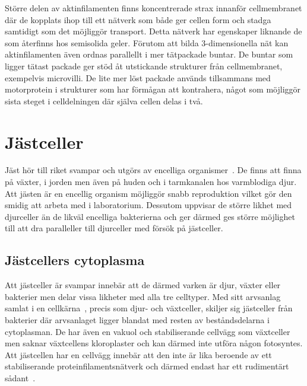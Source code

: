 Större delen av aktinfilamenten finns koncentrerade strax innanför cellmembranet där de kopplats ihop till ett nätverk som både ger cellen form och stadga samtidigt som det möjliggör transport. Detta nätverk har egenskaper liknande de som återfinns hos semisolida geler. Förutom att bilda 3-dimensionella nät kan aktinfilamenten även ordnas parallellt i mer tätpackade buntar. De buntar som ligger tätast packade ger stöd åt utstickande strukturer från cellmembranet, exempelvis microvilli. De lite mer löst packade används tillsammans med motorprotein i strukturer som har förmågan att kontrahera, något som möjliggör sista steget i celldelningen där själva cellen delas i två. 



\section{Jästceller}

Jäst hör till riket svampar och utgörs av encelliga organismer~\cite{SGD_yeast}.
De finns att finna på växter, i jorden men även på huden och i tarmkanalen hos varmblodiga djur. 
Att jästen är en encellig organism möjliggör snabb reproduktion vilket gör den smidig att arbeta med i laboratorium. Dessutom uppvisar de större likhet med djurceller än de likväl encelliga bakterierna och ger därmed ges större möjlighet till att dra paralleller till djurceller med försök på jästceller. 

\subsection{Jästcellers cytoplasma}
Att jästceller är svampar innebär att de därmed varken är djur, växter eller bakterier men delar vissa likheter med alla tre celltyper. Med sitt arvsanlag samlat i en cellkärna~\cite{SGD_yeast}, precis som djur- och växtceller, skiljer sig jästceller från bakterier där arvsanlaget ligger blandat med resten av beståndsdelarna i cytoplasman.
De har även en vakuol och stabiliserande cellvägg som växtceller men saknar växtcellens kloroplaster och kan därmed inte utföra någon fotosyntes. Att jästcellen har en cellvägg innebär att den inte är lika beroende av ett stabiliserande proteinfilamentsnätverk och därmed endast har ett rudimentärt sådant~\cite{Midtveldt_etal2016}.

